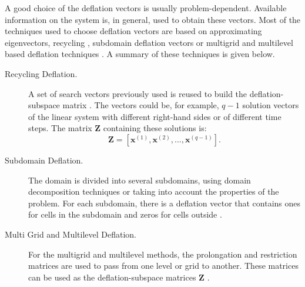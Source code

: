 \documentclass[12pt]{article}
\begin{document}
A good choice of the deflation vectors is usually problem-dependent. Available information on the system is, in general,
used to obtain these vectors.
Most of the techniques used to choose deflation vectors are based on approximating eigenvectors, 
recycling \cite{Clemens04}, subdomain deflation vectors \cite{Vuik02} or multigrid and multilevel based deflation techniques \cite{Tang09,Smith96}. A summary of these techniques is given below.
\begin{description}
 \item [Recycling Deflation.] A set of search vectors previously used is reused to build the deflation-subspace 
 matrix \cite{Clemens04}. 
The vectors could be, for example, $q-1$
solution vectors of the linear system with different right-hand sides or of different time steps.
The matrix $\mathbf{Z}$ containing these solutions is:
$$\mathbf{Z}=[\mathbf{x}^{(1)},\mathbf{x}^{(2)},...,\mathbf{x}^{(q-1)}].$$
 \item [Subdomain Deflation.] The domain is divided into several subdomains,
 using domain decomposition techniques or taking into account the properties of the problem.
For each subdomain, there is a deflation vector that contains ones for cells in the subdomain and zeros for cells outside \cite{Vuik02}.
 \item [Multi Grid and Multilevel Deflation.] For the multigrid and multilevel methods, 
 the prolongation and restriction matrices are used to pass from one level or grid to another. 
These matrices can be used as the deflation-subspace matrices $\mathbf{Z}$ \cite{Tang09}.
\end{description}
\end{document}
